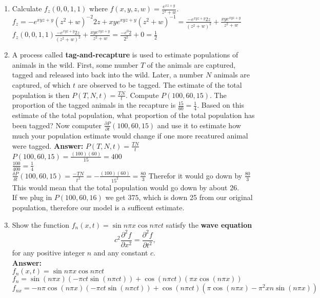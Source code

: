 \documentclass[11pt]{article}
\begin{document}
\begin{enumerate}
    
    \item Calculate $f_z(0,0,1,1)$ where $f(x,y,z,w) = \frac{e^{xz+y}}{z^2+w}$.
    \\
    $f_z=-e^{xyz+y}(z^2+w)^{-2}2z+xye^{xyz+y}(z^2+w)^{-1}= \frac{-e^{xyz+y}2z}{(z^2+w)^{2}}+\frac{xye^{xyz+y}}{z^2+w}$
    \\
    $f_z(0,0,1,1) \frac{-e^{xyz+y}2z}{(z^2+w)^{2}}+\frac{xye^{xyz+y}}{z^2+w}= \frac{-e^0 2}{2^2} + 0 = \frac{1}{2}$
    
    
    \item A process called \textbf{tag-and-recapture} is used to estimate populations of animals in the wild.  First, some number $T$ of the animals are captured, tagged and released into back into the wild.  Later, a number $N$ animals are captured, of which $t$ are observed to be tagged.  The estimate of the total population is then $P(T, N, t) = \frac{TN}{t}$.  Compute $P(100, 60, 15)$.  The proportion of the tagged animals in the recapture is $\frac{15}{60} = \frac{1}{4}$.  Based on this estimate of the total population, what proportion of the total population has been tagged?  Now computer $\frac{\partial P}{\partial t}(100, 60, 15)$ and use it to estimate how much your population estimate would change if one more recatured animal were tagged.
    \textbf{Answer:}
    $P(T,N,t)=\frac{TN}{t}$
    \\
    $P(100,60,15)= \frac{(100)(60)}{15}=400$
    \\
    $\frac{100}{400}=\frac{1}{4}$
    \\
    $\frac{\delta P}{\delta t}(100,60,15)=\frac{-TN}{t^2}=-\frac{(100)(60)}{15^2}=\frac{80}{3}$ Therefor it would go down by $\frac{80}{3}$
    \\
    This would mean that the total population would go down by about 26.
    \\
    If we plug in $P(100,60,16)$ we get $375$, which is down 25 from our original population, therefore our model is a sufficent estimate.
    
    
    
    
    
    \item Show the function $f_n(x,t) = \sin n\pi x \cos n \pi ct$ satisfy the \textbf{wave equation} 
    \[ c^2 \frac{\partial^2 f}{\partial x^2} = \frac{\partial^2 f}{\partial t^2},  \]
   for any positive integer $n$ and any constant $c$.
   \\
   
   \textbf{Answer:}
   \\
   $f_n(x,t) = \sin n\pi x \cos n \pi ct$
   \\
   $f_n= \sin (n \pi x)(- \pi c t \sin (n \pi ct))+ \cos(n \pi ct)(\pi x \cos (n \pi x))$
   \\
   $f_{nx}=-n\pi \cos (n \pi x)(- \pi c t \sin (n \pi c t))+ \cos (n \pi c t)(\pi \cos (n \pi x)- \pi^2 xn \sin (n \pi x))$
   

\end{enumerate}
\end{document}
